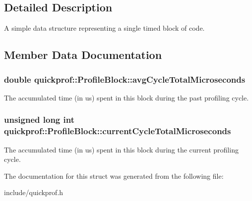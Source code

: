 \subsection{Detailed Description}
A simple data structure representing a single timed block of code. 

\subsection{Member Data Documentation}
\hypertarget{structquickprof_1_1_profile_block_a2f49cdcc0d7e85432cd75a3471b8944f}{
\subsubsection[{avgCycleTotalMicroseconds}]{\setlength{\rightskip}{0pt plus 5cm}double {\bf quickprof::ProfileBlock::avgCycleTotalMicroseconds}}}
\label{structquickprof_1_1_profile_block_a2f49cdcc0d7e85432cd75a3471b8944f}
The accumulated time (in us) spent in this block during the past profiling cycle. \hypertarget{structquickprof_1_1_profile_block_a21889706502a703740df63f41c1a0cfb}{
\subsubsection[{currentCycleTotalMicroseconds}]{\setlength{\rightskip}{0pt plus 5cm}unsigned long int {\bf quickprof::ProfileBlock::currentCycleTotalMicroseconds}}}
\label{structquickprof_1_1_profile_block_a21889706502a703740df63f41c1a0cfb}
The accumulated time (in us) spent in this block during the current profiling cycle. 

The documentation for this struct was generated from the following file:\begin{DoxyCompactItemize}
\item 
include/quickprof.h\end{DoxyCompactItemize}
